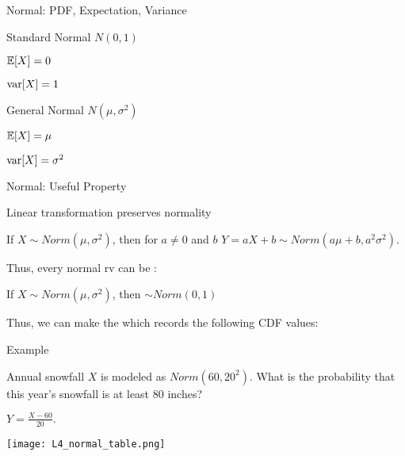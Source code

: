 \documentclass[handout,fleqn,aspectratio=169]{beamer}
\begin{document}
\begin{frame}{Normal: PDF, Expectation, Variance}

{
\plitemsep 0.1in
\bci 
\item<1-> Standard Normal $N(0,1)$
\item<1-> $\mathbb{E}[ X ] = 0$

\item<1-> $\text{var}[ X ] = 1$
\eci
}
{
\plitemsep 0.1in
\bci 
\item<2-> General Normal $N(\mu, \sigma^2)$

\item<2-> $\mathbb{E}[ X ] = \mu$

\item<2-> $\text{var}[ X ] = \sigma^2$

\eci
}

\medskip

\end{frame}

\begin{frame}{Normal: Useful Property}

\plitemsep 0.1in
\bci 
\item<2-> Linear transformation preserves normality

{
If $X \sim  Norm(\mu, \sigma^2) $, then for $a \neq 0$ and $b$ $Y = aX +b \sim Norm(a\mu +b,a^2 \sigma^2).$ 
}

\item<3-> Thus, every normal rv can be : 

If $X \sim  Norm(\mu, \sigma^2)$, then 
 $\sim Norm(0,1)$

\item<5-> Thus, we can make the  which records the following CDF values:

\eci
\end{frame}

\begin{frame}{Example}

\medskip

{
\plitemsep 0.1in
\bci 
\item<1-> Annual snowfall $X$ is modeled as $Norm(60,20^2).$ What is the probability that this year's snowfall is at least 80 inches?

\item<2-> $Y = \frac{X-60}{20}.$
\eci
}
{
\texttt{[image: L4\_normal\_table.png]}
}
\end{frame}
\end{document}
